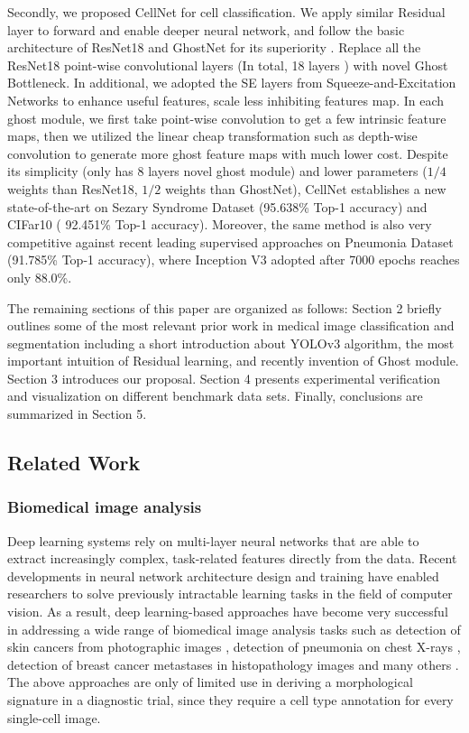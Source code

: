 Secondly, we proposed CellNet for cell classification. We apply similar Residual layer to forward and enable deeper neural network, and follow the basic architecture of ResNet18 and GhostNet for its superiority \cite{19}\cite{20}. Replace all the ResNet18 \cite{20} point-wise convolutional layers (In total, 18 layers ) with novel Ghost Bottleneck. In additional, we adopted the SE layers from Squeeze-and-Excitation Networks \cite{24} to enhance useful features, scale less inhibiting features map. In each ghost module, we first take point-wise convolution to get a few intrinsic feature maps, then we utilized the linear cheap transformation such as depth-wise convolution to generate more ghost feature maps with much lower cost.
Despite its simplicity (only has 8 layers novel ghost module) and lower parameters ($1/4$ weights than ResNet18\cite{20}, $1/2$ weights than GhostNet\cite{19}), CellNet establishes a new state-of-the-art on Sezary Syndrome Dataset (95.638\% Top-1 accuracy) and CIFar10\cite{21} ( 92.451\% Top-1 accuracy). Moreover, the same method is also very competitive against recent leading supervised approaches on Pneumonia Dataset (91.785\% Top-1 accuracy), where Inception V3 adopted after 7000 epochs reaches only 88.0\%\cite{38}. 

The remaining sections of this paper are organized as follows: Section 2 briefly outlines some of the most relevant  prior work in medical image classification and segmentation including a short introduction about YOLOv3 \cite{33} algorithm, the most important intuition of Residual learning, and recently invention of Ghost module.
Section 3 introduces our proposal. Section 4 presents experimental verification  and visualization on different benchmark data sets. Finally, conclusions are summarized in Section 5.

\subsection{Related Work}
\subsubsection{Biomedical image analysis}

Deep learning systems rely on multi-layer neural networks that are able to extract increasingly complex, task-related features directly from the data. Recent developments in neural network architecture design and training have enabled researchers to solve previously intractable learning tasks in the field of computer vision. As a result, deep learning-based approaches have become very successful in addressing a wide range of biomedical image analysis tasks such as detection of skin cancers from photographic images \cite{10}, detection of pneumonia on chest X-rays \cite{13}, detection of breast cancer metastases in histopathology images and many others \cite{2}. 
The above approaches are only of limited use in deriving a morphological signature in a diagnostic trial, since they require a cell type annotation for every single-cell image.


